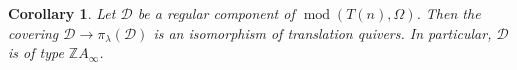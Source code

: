 \documentclass[a4paper,12pt]{amsart}
\newcommand{\cD}{\mathcal{D}}
\DeclareMathOperator{\modd}{mod}
\newtheorem{cor}[thm]{Corollary}
\begin{document}
\begin{cor}\cite[Corollary 7.2]{Daniel}\label{component}
Let $\cD$ be a regular component of $\modd(T(n),\Omega)$. Then the covering $\cD\rightarrow\pi_\lambda(\cD)$ is an isomorphism of translation quivers. In particular, $\cD$ is of type $\mathbb{Z}A_{\infty}$. 



\end{cor}


 
\begin{figure}[!h]

\begin{center}

\end{center}
\end{figure}
\end{document}
